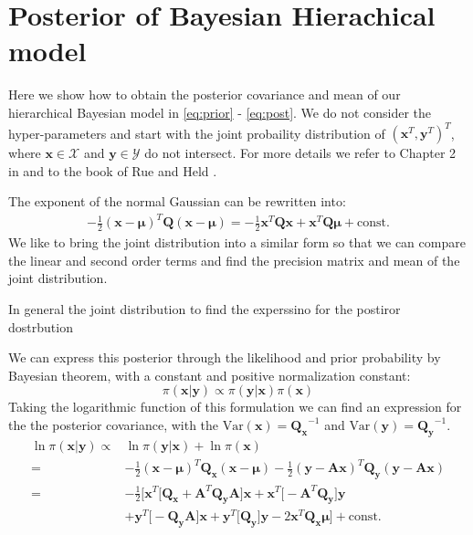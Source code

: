 \chapter{Posterior of Bayesian Hierachical model}
\label{ap:bayesian}
Here we show how to obtain the posterior covariance and mean of our hierarchical Bayesian model in \ref{eq:prior} - \ref{eq:post}.
We do not consider the hyper-parameters and start with the joint probaility distribution of $(\bm{x}^T,\bm{y}^T)^T$, where $\bm{x} \in \mathcal{X}$ and $\bm{y} \in \mathcal{Y}$ do not intersect.
For more details we refer to Chapter 2 in \cite{bishop2006pattern} and to the book of Rue and Held \cite{rue2005gaussian}.

The exponent of the normal Gaussian can be rewritten into:
\begin{align}
\label{eq:gauss}
    -\frac{1}{2}(\bm{x} - \bm{\mu})^T \bm{Q} (\bm{x} - \bm{\mu}) = - \frac{1}{2} \bm{x}^T \bm{Q} \bm{x} + \bm{x}^T \bm{Q} \bm{\mu} + \text{const.}
\end{align}
We like to bring the joint distribution into a similar form so that we can compare the linear and second order terms and find the precision matrix and mean of the joint distribution.


In general the joint distribution to find the experssino for the postiror dostrbution

We can express this posterior through the likelihood and prior probability by Bayesian theorem, with a constant and positive normalization constant:
\begin{equation}
    \pi(\bm{x} |\bm{y}) \propto \pi( \bm{y} | \bm{x} )  \pi(\bm{x} )
\end{equation}
Taking the logarithmic function of this formulation we can find an expression for the the posterior covariance, with the $\text{Var}(\bm{x}) = \bm{Q_x}^{-1}$ and $\text{Var}(\bm{y}) = \bm{Q_y}^{-1}$.
\begin{align}
\ln{\pi(\bm{x|y})} \propto&  \ln{ \pi( \bm{y} | \bm{x} ) } + \ln{\pi( \bm{x} ) }\\
=& - \frac{1}{2} (\bm{x} - \bm{\mu} )^T \bm{Q_x} (\bm{x} - \bm{\mu} ) - \frac{1}{2} (\bm{y} - \bm{Ax} )^T \bm{Q_y} (\bm{y} - \bm{Ax} )    \\
=& - \frac{1}{2} \bigg[ \bm{x}^T \big[ \bm{Q_x} + \bm{A}^T \bm{Q_y} \bm{A} \big] \bm{x}  + \bm{x}^T \big[ - \bm{A}^T \bm{Q_y} \big] \bm{y} \\
&+ \bm{y}^T \big[ - \bm{Q_y A} \big] \bm{x} + \bm{y}^T \big[ \bm{Q_y} \big] \bm{y} - 2 \bm{x}^T \bm{Q_x \mu }  \bigg] + \text{const.}
\end{align}

